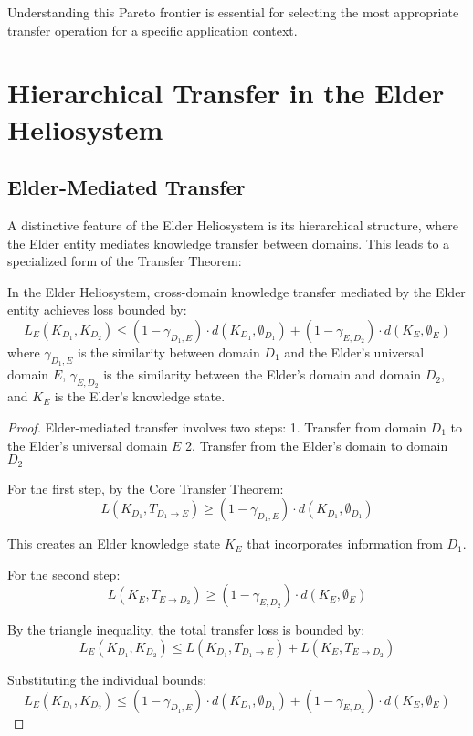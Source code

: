 Understanding this Pareto frontier is essential for selecting the most appropriate transfer operation for a specific application context.

\section{Hierarchical Transfer in the Elder Heliosystem}

\subsection{Elder-Mediated Transfer}

A distinctive feature of the Elder Heliosystem is its hierarchical structure, where the Elder entity mediates knowledge transfer between domains. This leads to a specialized form of the Transfer Theorem:

\begin{theorem}
In the Elder Heliosystem, cross-domain knowledge transfer mediated by the Elder entity achieves loss bounded by:
\begin{equation}
L_{E}(K_{D_1}, K_{D_2}) \leq (1 - \gamma_{D_1,E}) \cdot d(K_{D_1}, \emptyset_{D_1}) + (1 - \gamma_{E,D_2}) \cdot d(K_{E}, \emptyset_{E})
\end{equation}
where $\gamma_{D_1,E}$ is the similarity between domain $D_1$ and the Elder's universal domain $E$, $\gamma_{E,D_2}$ is the similarity between the Elder's domain and domain $D_2$, and $K_E$ is the Elder's knowledge state.
\end{theorem}

\begin{proof}
Elder-mediated transfer involves two steps:
1. Transfer from domain $D_1$ to the Elder's universal domain $E$
2. Transfer from the Elder's domain to domain $D_2$

For the first step, by the Core Transfer Theorem:
\begin{equation}
L(K_{D_1}, T_{D_1 \to E}) \geq (1 - \gamma_{D_1,E}) \cdot d(K_{D_1}, \emptyset_{D_1})
\end{equation}

This creates an Elder knowledge state $K_E$ that incorporates information from $D_1$.

For the second step:
\begin{equation}
L(K_E, T_{E \to D_2}) \geq (1 - \gamma_{E,D_2}) \cdot d(K_E, \emptyset_E)
\end{equation}

By the triangle inequality, the total transfer loss is bounded by:
\begin{equation}
L_E(K_{D_1}, K_{D_2}) \leq L(K_{D_1}, T_{D_1 \to E}) + L(K_E, T_{E \to D_2})
\end{equation}

Substituting the individual bounds:
\begin{equation}
L_E(K_{D_1}, K_{D_2}) \leq (1 - \gamma_{D_1,E}) \cdot d(K_{D_1}, \emptyset_{D_1}) + (1 - \gamma_{E,D_2}) \cdot d(K_E, \emptyset_E)
\end{equation}
\end{proof}

